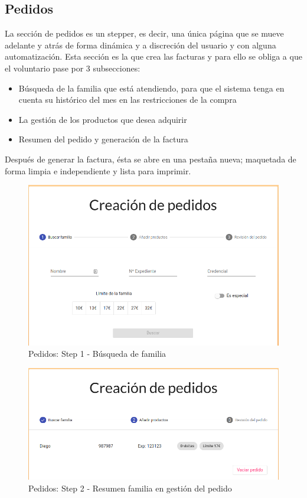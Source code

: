 \subsection{Pedidos}
La sección de pedidos es un stepper, es decir, una única página que se mueve adelante y atrás de forma dinámica y a discreción del usuario y con alguna automatización. Esta sección es la que crea las facturas y para ello se obliga a que el voluntario pase por 3 subsecciones:
\begin{itemize}
    \item Búsqueda de la familia que está atendiendo, para que el sistema tenga en cuenta su histórico del mes en las restricciones de la compra
    \item La gestión de los productos que desea adquirir
    \item Resumen del pedido y generación de la factura
\end{itemize}
\vspace{1em}
\par Después de generar la factura, ésta se abre en una pestaña nueva; maquetada de forma limpia e independiente y lista para imprimir.
\begin{figure}[h]
\centering
\includegraphics[scale=0.47]{archivos/pedidos-step1.png}
\caption{Pedidos: Step 1 - Búsqueda de familia}
\label{fig:pedidos_step1}
\end{figure}
\begin{figure}[h]
\centering
\includegraphics[scale=0.47]{archivos/pedidos-step2.png}
\caption{Pedidos: Step 2 - Resumen familia en gestión del pedido}
\label{fig:pedidos_step2_1}
\end{figure}
